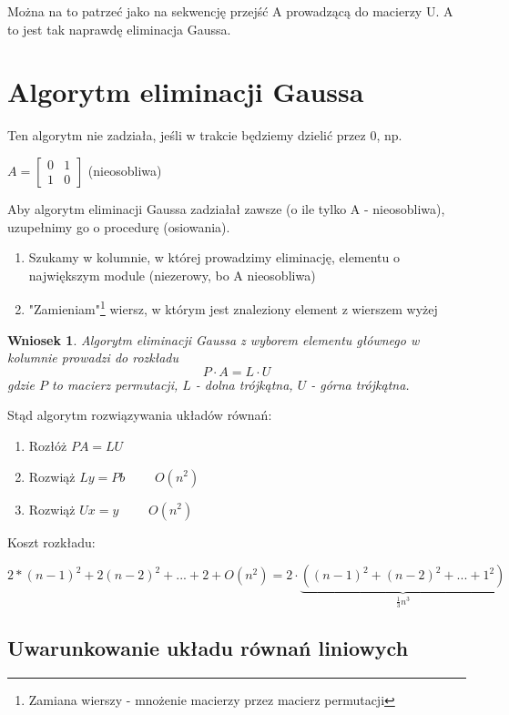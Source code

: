 \documentclass[hidelinks,a4paper,fleqn,oneside]{book}
\newtheorem{wniosek}{Wniosek}
\begin{document}
Można na to patrzeć jako na sekwencję przejść A prowadzącą do macierzy U. A to jest tak naprawdę eliminacja Gaussa.

\section{Algorytm eliminacji Gaussa}
Ten algorytm nie zadziała, jeśli w trakcie będziemy dzielić przez 0, np.

$A = \left[
	\begin{array}{cc}
		0 & 1 \\
		1 & 0 
\end{array}\right]$ (nieosobliwa)
    
Aby algorytm eliminacji Gaussa zadziałał zawsze (o ile tylko A - nieosobliwa), uzupełnimy go o procedurę  (osiowania). 

\begin{enumerate}
	\item Szukamy w kolumnie, w której prowadzimy eliminację, elementu o największym module (niezerowy, bo A nieosobliwa)
	\item "Zamieniam"\footnote{Zamiana wierszy - mnożenie macierzy przez macierz permutacji} wiersz, w którym jest znaleziony element z wierszem wyżej 
\end{enumerate}


\begin{wniosek} Algorytm eliminacji Gaussa z wyborem elementu głównego w kolumnie prowadzi do rozkładu
	\[
		P \cdot A = L \cdot U
	\]
	gdzie $P$ to macierz permutacji, $L$ - dolna trójkątna, $U$ - górna trójkątna.
	
\end{wniosek}

Stąd algorytm rozwiązywania układów równań:

\begin{enumerate}
	\item Rozłóż $PA = LU$
	\item Rozwiąż $Ly = Pb$ $\quad\quad O(n^2)$
	\item Rozwiąż $Ux = y$ $\quad\quad O(n^2)$
\end{enumerate}

Koszt rozkładu:

$2*(n-1)^2 + 2(n-2)^2 + ... + 2 + O(n^2) = 2 \cdot \underbrace{((n-1)^2 + (n-2)^2 + ... + 1^2)}_{\frac{1}{3}n^3}$

\subsection{Uwarunkowanie układu równań liniowych}
\end{document}
